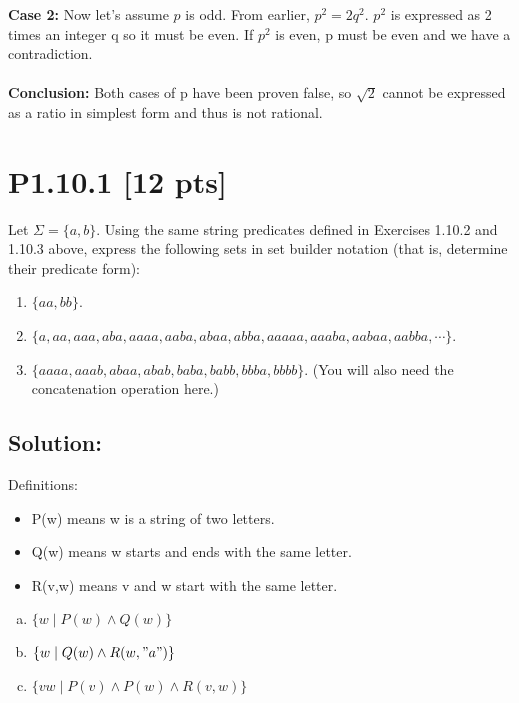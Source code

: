 \documentclass[12pt]{article}
\begin{document}
\textbf{Case 2:}
Now let's assume $p$ is odd. From earlier, $p^2 = 2q^2$. $p^2$ is expressed as 2 times an integer q so it must be even. If $p^2$ is even, p must be even and we have a contradiction.\\\\

\textbf{Conclusion:}
Both cases of p have been proven false, so $\sqrt{2}$ cannot be expressed as a ratio in simplest form and thus is not rational.


\newpage
\section*{\textbf{P1.10.1} [12 pts]}
Let $\Sigma = \{a, b\}$. Using the same string predicates defined in Exercises 1.10.2 and 1.10.3 above, express the following sets in set builder notation (that is, determine their predicate form):

\begin{enumerate}[label=(\alph*)]
\item $\{aa,bb\}$.

\item $\{a,aa,aaa,aba,aaaa,aaba,abaa,abba,aaaaa,aaaba,aabaa,aabba,\cdots\}$.

\item $\{aaaa, aaab, abaa, abab, baba, babb, bbba, bbbb\}$. (You will also need the concatenation operation here.)

\end{enumerate}


\subsection*{\textbf{Solution:}}
Definitions:
\begin{itemize}
    \item P(w) means w is a string of two letters.

    \item Q(w) means w starts and ends with the same letter.

    \item R(v,w) means v and w start with the same letter.
\end{itemize}
\begin{enumerate}[(a)]
    \item $\{w \mid P(w) \land Q(w)\}$

    \item $\{w \mid Q(w) \land R(w, "a")\}$

    \item $\{vw \mid P(v) \land P(w) \land R(v,w)\}$

\end{enumerate}
\end{document}
